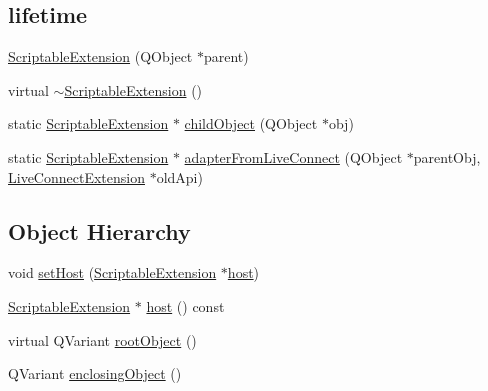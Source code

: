 \subsection*{lifetime}
\begin{DoxyCompactItemize}
\item 
\hyperlink{classKParts_1_1ScriptableExtension_ab5aa7a70fe1b0643b5498529e574ef76}{Scriptable\+Extension} (Q\+Object $\ast$parent)
\item 
virtual \hyperlink{classKParts_1_1ScriptableExtension_aea7c940a43c9fba7279bc4d3a1959407}{$\sim$\+Scriptable\+Extension} ()
\item 
static \hyperlink{classKParts_1_1ScriptableExtension}{Scriptable\+Extension} $\ast$ \hyperlink{classKParts_1_1ScriptableExtension_a03e2028b730dbe724f27d97ff6422325}{child\+Object} (Q\+Object $\ast$obj)
\item 
static \hyperlink{classKParts_1_1ScriptableExtension}{Scriptable\+Extension} $\ast$ \hyperlink{classKParts_1_1ScriptableExtension_afe1e57b7a4ec5119d0d8eefff3ba6134}{adapter\+From\+Live\+Connect} (Q\+Object $\ast$parent\+Obj, \hyperlink{classKParts_1_1LiveConnectExtension}{Live\+Connect\+Extension} $\ast$old\+Api)
\end{DoxyCompactItemize}
\subsection*{Object Hierarchy}
\begin{DoxyCompactItemize}
\item 
void \hyperlink{classKParts_1_1ScriptableExtension_ac643fa084835c8fc07abd9072c1a079c}{set\+Host} (\hyperlink{classKParts_1_1ScriptableExtension}{Scriptable\+Extension} $\ast$\hyperlink{classKParts_1_1ScriptableExtension_a6505327b97b84ba5d5bae54664ee3ba6}{host})
\item 
\hyperlink{classKParts_1_1ScriptableExtension}{Scriptable\+Extension} $\ast$ \hyperlink{classKParts_1_1ScriptableExtension_a6505327b97b84ba5d5bae54664ee3ba6}{host} () const 
\item 
virtual Q\+Variant \hyperlink{classKParts_1_1ScriptableExtension_a2e74d0dce5db4528968dc545a73e22d6}{root\+Object} ()
\item 
Q\+Variant \hyperlink{classKParts_1_1ScriptableExtension_a1654d1f14b8f3184c4a2c4e382826aee}{enclosing\+Object} ()
\end{DoxyCompactItemize}
